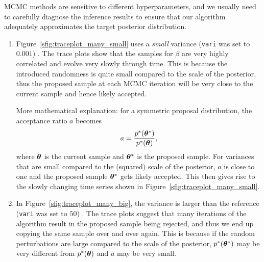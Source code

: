 \begin{exenumerate}
\begin{solution}

  MCMC methods are sensitive to different hyperparameters, and we
  usually need to carefully diagnose the inference results to ensure
  that our algorithm adequately approximates the target posterior
  distribution.


  \begin{enumerate}[label=(\roman*)]
	
  \item Figure~\ref{sfig:traceplot_many_small} uses a \textit{small}
    variance (\lstinline{vari} was set to $0.001$) . The trace plots show
    that the samples for $\beta$ are very highly correlated and evolve
    very slowly through time. This is because the introduced
    randomness is quite small compared to the scale of the
    posterior, thus the proposed sample at each MCMC iteration will be
    very close to the current sample and hence likely accepted.

    More mathematical explanation: for a symmetric proposal
    distribution, the acceptance ratio $a$ becomes
    \begin{equation}
      a =  \frac{p^*(\boldsymbol{\theta}^*)}{p^*(\boldsymbol{\theta})},
    \end{equation}
    where $\boldsymbol{\theta}$ is the current sample and $\boldsymbol{\theta}^*$ is the
    proposed sample. For variances that are small compared to the
    (squared) scale of the posterior, $a$ is close to one and the proposed
    sample $\boldsymbol{\theta}^*$ gets likely accepted. This then gives rise to the
    slowly changing time series shown in
    Figure~\ref{sfig:traceplot_many_small}.
	
  \item In Figure~\ref{sfig:traceplot_many_big}, the variance is
    larger than the reference (\lstinline{vari} was set to $50$) . The trace
    plots suggest that many iterations of the algorithm result in the
    proposed sample being rejected, and thus we end up copying the
    same sample over and over again. This is because if the random
    perturbations are large compared to the scale of the
    posterior, $p^*(\boldsymbol{\theta}^*)$ may be very different from
    $p^*(\boldsymbol{\theta})$ and $a$ may be very small.

  \end{enumerate}

  \end{solution}


\end{exenumerate}
